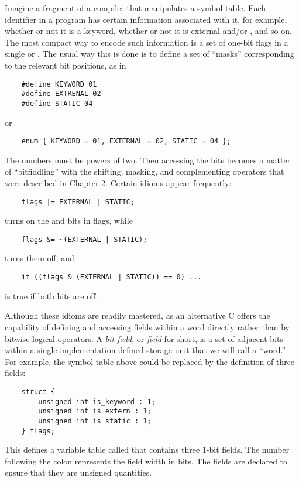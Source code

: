 Imagine a fragment of a compiler that manipulates a symbol table.
Each identifier in a program has certain information associated with it, for example, whether or not it is a keyword, whether or not it is external and/or , and so on.
The most compact way to encode such information is a set of one-bit flags in a single  or .
The usual way this is done is to define a set of ``masks'' corresponding to the relevant bit positions, as in
\begin{lstlisting}
	#define KEYWORD 01
	#define EXTRENAL 02
	#define STATIC 04
\end{lstlisting}
or
\begin{lstlisting}
	enum { KEYWORD = 01, EXTERNAL = 02, STATIC = 04 };
\end{lstlisting}
The numbers must be powers of two. Then accessing the bits becomes a matter of ``bitfiddling'' with the shifting, masking, and complementing operators that were described in Chapter 2.
Certain idioms appear frequently:
\begin{lstlisting}
	flags |= EXTERNAL | STATIC;
\end{lstlisting}
turns on the  and  bits in flags, while
\begin{lstlisting}
	flags &= ~(EXTERNAL | STATIC);
\end{lstlisting}
turns them off, and
\begin{lstlisting}
	if ((flags & (EXTERNAL | STATIC)) == 0) ...
\end{lstlisting}
is true if both bits are off.

Although these idioms are readily mastered, as an alternative C offers the capability of defining and accessing fields within a word directly rather than by bitwise logical operators.
A \emph{bit-field}, or \emph{field} for short, is a set of adjacent bits within a single implementation-defined storage unit that we will call a ``word.''
For example, the symbol table  above could be replaced by the definition of three fields:
\begin{lstlisting}
	struct {
		unsigned int is_keyword : 1;
		unsigned int is_extern : 1;
		unsigned int is_static : 1;
	} flags;
\end{lstlisting}
This defines a variable table called  that contains three 1-bit fields.
The number following the colon represents the field width in bits. The fields are declared  to ensure that they are unsigned quantities.

